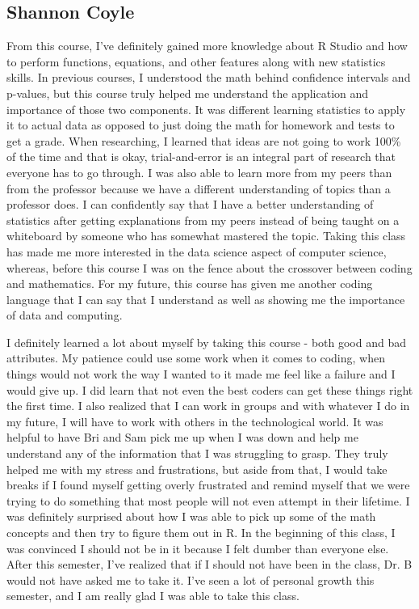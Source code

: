 \documentclass[12pt, letterpaper]{article}
\begin{document}
\subsection{Shannon Coyle}
From this course, I've definitely gained more knowledge about R Studio and how to perform functions, equations, and other features along with new statistics skills.  In previous courses, I understood the math behind confidence intervals and p-values, but this course truly helped me understand the application and importance of those two components.  It was different learning statistics to apply it to actual data as opposed to just doing the math for homework and tests to get a grade.  When researching, I learned that ideas are not going to work 100\% of the time and that is okay, trial-and-error is an integral part of research that everyone has to go through.  I was also able to learn more from my peers than from the professor because we have a different understanding of topics than a professor does.  I can confidently say that I have a better understanding of statistics after getting explanations from my peers instead of being taught on a whiteboard by someone who has somewhat mastered the topic.  Taking this class has made me more interested in the data science aspect of computer science, whereas, before this course I was on the fence about the crossover between coding and mathematics.  For my future, this course has given me another coding language that I can say that I understand as well as showing me the importance of data and computing.  

I definitely learned a lot about myself by taking this course - both good and bad attributes.  My patience could use some work when it comes to coding, when things would not work the way I wanted to it made me feel like a failure and I would give up.  I did learn that not even the best coders can get these things right the first time.  I also realized that I can work in groups and with whatever I do in my future, I will have to work with others in the technological world.  It was helpful to have Bri and Sam pick me up when I was down and help me understand any of the information that I was struggling to grasp.  They truly helped me with my stress and frustrations, but aside from that, I would take breaks if I found myself getting overly frustrated and remind myself that we were trying to do something that most people will not even attempt in their lifetime.  I was definitely surprised about how I was able to pick up some of the math concepts and then try to figure them out in R.  In the beginning of this class, I was convinced I should not be in it because I felt dumber than everyone else.  After this semester, I've realized that if I should not have been in the class, Dr. B would not have asked me to take it.  I've seen a lot of personal growth this semester, and I am really glad I was able to take this class.  
\end{document}
